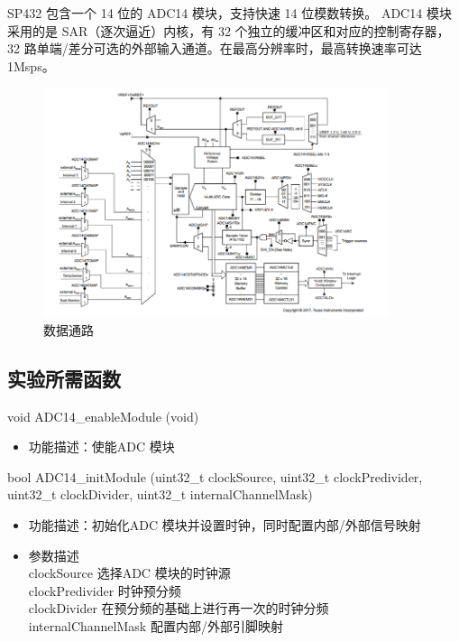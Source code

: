\documentclass[a4paper,10pt,UTF8]{paper}
\numberwithin{equation}{section}
\numberwithin{figure}{section}
\begin{document}
SP432 包含一个 14 位的 ADC14 模块，支持快速 14 位模数转换。 ADC14 模块采用的是 SAR（逐次逼近）内核，有 32 个独立的缓冲区和对应的控制寄存器， 32 路单端/差分可选的外部输入通道。在最高分辨率时，最高转换速率可达 1Msps。

\begin{figure}[h]
    \centering
    \includegraphics[width=0.9\textwidth]{img/2.PNG}
    \caption{数据通路}
    \label{fig:2}
\end{figure}



\subsection{实验所需函数}

\begin{ccode}
    void ADC14_enableModule  (void)
    
\end{ccode}

\begin{itemize}
    \item 功能描述：使能ADC 模块
\end{itemize}

\begin{ccode}
    bool ADC14_initModule (uint32_t clockSource, 
    uint32_t clockPredivider, uint32_t clockDivider,
    uint32_t internalChannelMask)  
\end{ccode}

\begin{itemize}
    \item 功能描述：初始化ADC 模块并设置时钟，同时配置内部/外部信号映射
    \item 参数描述 \\ clockSource    选择ADC 模块的时钟源 \\
          clockPredivider  时钟预分频 \\
          clockDivider      在预分频的基础上进行再一次的时钟分频 \\
          internalChannelMask     配置内部/外部引脚映射 \\
          
\end{itemize}
\end{document}
